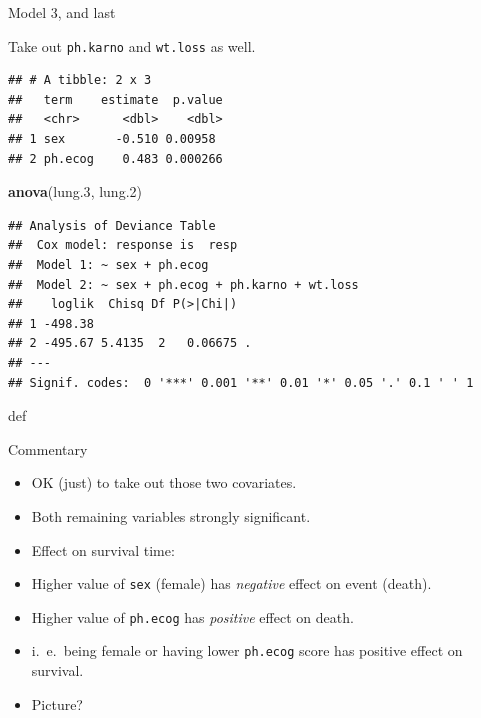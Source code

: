\documentclass[ignorenonframetext,]{beamer}
\newenvironment{Shaded}{\begin{snugshade}}{\end{snugshade}}
\newcommand{\FloatTok}[1]{\textcolor[rgb]{0.00,0.00,0.81}{#1}}
\newcommand{\KeywordTok}[1]{\textcolor[rgb]{0.13,0.29,0.53}{\textbf{#1}}}
\newcommand{\NormalTok}[1]{#1}
\newcommand{\OperatorTok}[1]{\textcolor[rgb]{0.81,0.36,0.00}{\textbf{#1}}}
\newcommand{\StringTok}[1]{\textcolor[rgb]{0.31,0.60,0.02}{#1}}
\begin{document}
\begin{frame}[fragile]{Model 3, and last}
\protect\hypertarget{model-3-and-last}{}

Take out \texttt{ph.karno} and \texttt{wt.loss} as well.

\begin{Shaded}
\end{Shaded}

\begin{verbatim}
## # A tibble: 2 x 3
##   term    estimate  p.value
##   <chr>      <dbl>    <dbl>
## 1 sex       -0.510 0.00958 
## 2 ph.ecog    0.483 0.000266
\end{verbatim}

\begin{Shaded}
\begin{Highlighting}[]
\KeywordTok{anova}\NormalTok{(lung}\FloatTok{.3}\NormalTok{, lung}\FloatTok{.2}\NormalTok{)}
\end{Highlighting}
\end{Shaded}

\begin{verbatim}
## Analysis of Deviance Table
##  Cox model: response is  resp
##  Model 1: ~ sex + ph.ecog
##  Model 2: ~ sex + ph.ecog + ph.karno + wt.loss
##    loglik  Chisq Df P(>|Chi|)  
## 1 -498.38                      
## 2 -495.67 5.4135  2   0.06675 .
## ---
## Signif. codes:  0 '***' 0.001 '**' 0.01 '*' 0.05 '.' 0.1 ' ' 1
\end{verbatim}

def

\end{frame}

\begin{frame}[fragile]{Commentary}
\protect\hypertarget{commentary}{}

\begin{itemize}
\item
  OK (just) to take out those two covariates.
\item
  Both remaining variables strongly significant.
\item
  Effect on survival time:
\item
  Higher value of \texttt{sex} (female) has \emph{negative} effect on
  event (death).
\item
  Higher value of \texttt{ph.ecog} has \emph{positive} effect on death.
\item
  i.~e.~being female or having lower \texttt{ph.ecog} score has positive
  effect on survival.
\item
  Picture?
\end{itemize}

\end{frame}
\end{document}

